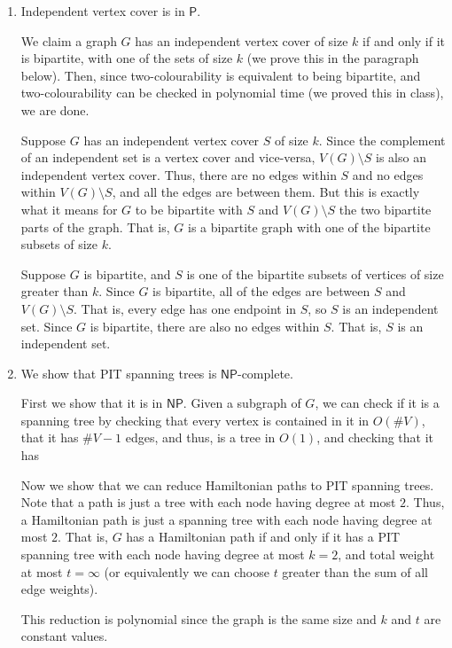 \documentclass[12 pt, letterpaper]{hmcpset}
\begin{document}
\begin{solution}
	\begin{enumerate}
		\item Independent vertex cover is in $\mathsf{P}$.

			We claim a graph $G$ has an independent vertex cover of size $k$ if and only if it is bipartite, with one of the sets of size $k$ (we prove this in the paragraph below). Then, since two-colourability is equivalent to being bipartite, and two-colourability can be checked in polynomial time (we proved this in class), we are done.

			Suppose $G$ has an independent vertex cover $S$ of size $k$. Since the complement of an independent set is a vertex cover and vice-versa, $V(G) \setminus S$ is also an independent vertex cover. Thus, there are no edges within $S$ and no edges within $V(G) \setminus S$, and all the edges are between them. But this is exactly what it means for $G$ to be bipartite with $S$ and $V(G) \setminus S$ the two bipartite parts of the graph. That is, $G$ is a bipartite graph with one of the bipartite subsets of size $k$.

			Suppose $G$ is bipartite, and $S$ is one of the bipartite subsets of vertices of size greater than $k$. Since $G$ is bipartite, all of the edges are between $S$ and $V(G) \setminus S$. That is, every edge has one endpoint in $S$, so $S$ is an independent set. Since $G$ is bipartite, there are also no edges within $S$. That is, $S$ is an independent set.

		\item We show that PIT spanning trees is $\mathsf{NP}$-complete.

			First we show that it is in $\mathsf{NP}$. Given a subgraph of $G$, we can check if it is a spanning tree by checking that every vertex is contained in it in $O(\#V)$, that it has  $\#V - 1$ edges, and thus, is a tree in $O(1)$, and checking that it has

			Now we show that we can reduce Hamiltonian paths to PIT spanning trees. Note that a path is just a tree with each node having degree at most $2$. Thus, a Hamiltonian path is just a spanning tree with each node having degree at most $2$. That is, $G$ has a Hamiltonian path if and only if it has a PIT spanning tree with each node having degree at most $k = 2$, and total weight at most $t = \infty$ (or equivalently we can choose $t$ greater than the sum of all edge weights).

			This reduction is polynomial since the graph is the same size and $k$ and $t$ are constant values.
	\end{enumerate}
\end{solution}
\end{document}
